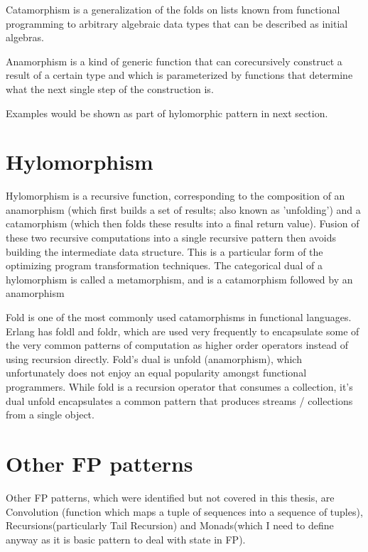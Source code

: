 Catamorphism is a generalization of the folds on lists known from functional programming to arbitrary algebraic data types that can be described as initial algebras.

Anamorphism is a kind of generic function that can corecursively construct a result of a certain type and which is parameterized by functions that determine what the next single step of the construction is.

Examples would be shown as part of hylomorphic pattern in next section.

\section{Hylomorphism}

Hylomorphism is a recursive function, corresponding to the composition of an anamorphism (which first builds a set of results; also known as 'unfolding') and a catamorphism (which then folds these results into a final return value). Fusion of these two recursive computations into a single recursive pattern then avoids building the intermediate data structure. This is a particular form of the optimizing program transformation techniques. The categorical dual of a hylomorphism is called a metamorphism, and is a catamorphism followed by an anamorphism~\cite{res25}




Fold is one of the most commonly used catamorphisms in functional languages. Erlang has foldl and foldr, which are used very frequently to encapsulate some of the very common patterns of computation as higher order operators instead of using recursion directly. Fold's dual is unfold (anamorphism), which unfortunately does not enjoy an equal popularity amongst functional programmers. While fold is a recursion operator that consumes a collection, it's dual unfold encapsulates a common pattern that produces streams / collections from a single object.

\section{Other FP patterns}
Other FP patterns, which were identified but not covered in this thesis, are Convolution (function which maps a tuple of sequences into a sequence of tuples), Recursions(particularly Tail Recursion) and Monads(which I need to define anyway as it is basic pattern to deal with state in FP).

